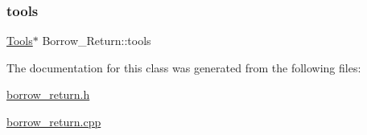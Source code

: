 \mbox{\label{class_borrow___return_abda1b5957575aacd2a6d705020aa4476}} 
\subsubsection{\texorpdfstring{tools}{tools}}
{\footnotesize\ttfamily \mbox{\hyperlink{class_tools}{Tools}}$\ast$ Borrow\+\_\+\+Return\+::tools\hspace{0.3cm}{\ttfamily [private]}}



The documentation for this class was generated from the following files\+:\begin{DoxyCompactItemize}
\item 
\mbox{\hyperlink{borrow__return_8h}{borrow\+\_\+return.\+h}}\item 
\mbox{\hyperlink{borrow__return_8cpp}{borrow\+\_\+return.\+cpp}}\end{DoxyCompactItemize}
